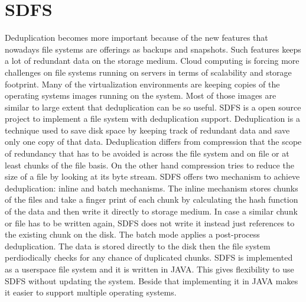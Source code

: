 \section{SDFS}
\noindent Deduplication becomes more important because of the new features 
that nowadays file systems are offerings as backups and snapshots.
Such features keeps a lot of redundant data on the storage medium.
Cloud computing is forcing more challenges on file systems running
on servers in terms of scalability and storage footprint. Many
of the virtualization environments are keeping copies of the operating systems
images running on the system. Most of those images are similar to large extent
that deduplication can be so useful\cite{usenix}.
\newline\newline
\noindent SDFS is a open source project to implement a file system with deduplication support. Deduplication is a technique
used to save disk space by keeping track of redundant data and save only one copy of that data. Deduplication differs
from compression that the scope of redundancy that has to be avoided is across the file system and on file or at
 least chunks of the file basis. On the other hand compression tries to reduce the size of a file by looking at its byte stream.
\newline
\noindent SDFS offers two mechanism to achieve deduplication: inline and batch mechanisms. The inline mechanism stores chunks of the files and
take a finger print of each chunk by calculating the hash function of the data and then write it directly to storage medium. In case
a similar chunk or file has to be written again, SDFS does not write it instead just references to the existing chunk on the disk.
The batch mode applies a post-process deduplication. The data is stored directly to the disk then the file system perdiodically checks 
for any chance of duplicated chunks.
\newline\newline
\noindent SDFS is implemented as a userspace file system and it is written in JAVA. This gives flexibility to use SDFS without updating the system.
Beside that implementing it in JAVA makes it easier to support multiple operating systems.

